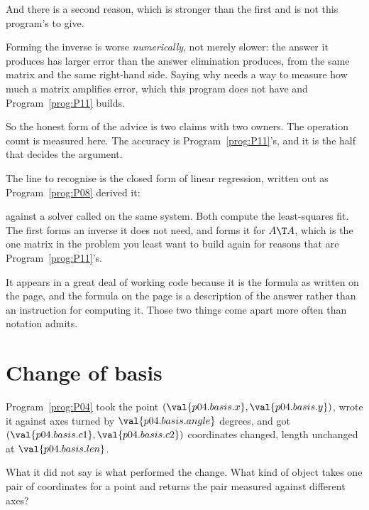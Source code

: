 \begin{fr}
And there is a second reason, which is stronger than the first and is not
this program's to give.

Forming the inverse is worse \emph{numerically}, not merely slower: the answer
it produces has larger error than the answer elimination produces, from the
same matrix and the same right-hand side. Saying why needs a way to measure how
much a matrix amplifies error, which this program does not have and
Program~\ref{prog:P11} builds.

So the honest form of the advice is two claims with two owners. The operation
count is measured here. The accuracy is Program~\ref{prog:P11}'s, and it is the
half that decides the argument.
\end{fr}

\begin{aibox}
The line to recognise is the closed form of linear regression, written out as
Program~\ref{prog:P08} derived it:
\begin{center}
\end{center}
against a solver called on the same system. Both compute the least-squares fit.
The first forms an inverse it does not need, and forms it for $A\T A$, which is
the one matrix in the problem you least want to build \dash{} again for reasons
that are Program~\ref{prog:P11}'s.

It appears in a great deal of working code because it is the formula as
written on the page, and the formula on the page is a description of the
answer rather than an instruction for computing it. Those two things come apart
more often than notation admits.
\end{aibox}

\section{Change of basis}
\label{sec:P09-basis}

\begin{fr}
Program~\ref{prog:P04} took the point
$(\val{p04.basis.x}, \val{p04.basis.y})$, wrote it against axes turned by
$\val{p04.basis.angle}$ degrees, and got
$(\val{p04.basis.c1}, \val{p04.basis.c2})$ \dash{} coordinates changed, length
unchanged at $\val{p04.basis.len}$.

What it did not say is what performed the change. What kind of object takes one
pair of coordinates for a point and returns the pair measured against different
axes?
\dotline
\nextframe
\end{fr}

